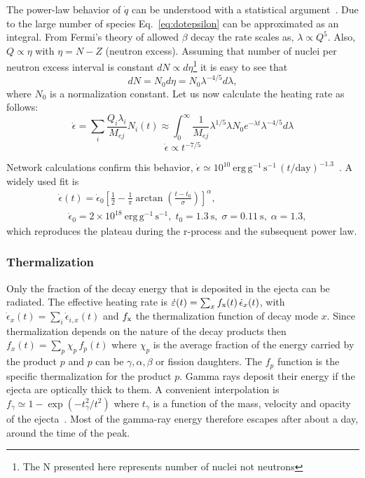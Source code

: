 The power-law behavior of $\dot q$ can be understood with a statistical argument~\cite{metzger_electromagnetic_2010,hotokezaka_analytic_2017}.
Due to the large number of species Eq.~\ref{eq:dotepsilon} can be approximated as an integral.
From Fermi's theory of allowed $\beta$ decay the rate scales as, $\lambda\propto Q^{5}$.
Also, $Q\propto\eta$ with $\eta=N-Z$ (neutron excess).
Assuming that number of nuclei per neutron excess interval is constant $dN\propto d\eta$\footnote{The N presented here represents number of nuclei not neutrons} it is easy to see that
\begin{equation}
  dN=N_0d\eta=N_0\lambda^{-4/5}d\lambda,
\end{equation} 
\noindent where $N_0$ is a normalization constant.
Let us now calculate the heating rate as follows:
\begin{equation}
  \dot\epsilon=\sum_i \frac{Q_i\lambda_i}{M_{ej}} N_i(t)\approx\int_{0}^{\infty}\frac{1}{M_{ej}}\lambda^{1/5}\lambda N_0e^{-\lambda t}\lambda^{-4/5}d\lambda
\end{equation} 
\begin{equation}
  \dot \epsilon \propto t^{-7/5}
\end{equation}

Network calculations confirm this behavior, $\dot \epsilon\simeq10^{10}~\mathrm{erg\,g^{-1}\,s^{-1}}\,(t/\mathrm{day})^{-1.3}$~\cite{metzger_electromagnetic_2010,korobkin_astrophysical_2012}.
A widely used fit is~\cite{korobkin_astrophysical_2012}
\begin{align}\label{eq:korobkin}
  \dot \epsilon(t)=\dot \epsilon_0\left[\frac{1}{2}-\frac{1}{\pi}\arctan\left(\frac{t-t_0}{\sigma}\right)\right]^{\alpha},\\
  \quad \dot \epsilon_0=2\times10^{18}~\mathrm{erg\,g^{-1}\,s^{-1}},\; t_0=1.3~\mathrm{s},\; \sigma=0.11~\mathrm{s},\; \alpha=1.3,
\end{align}
which reproduces the plateau during the r-process and the subsequent power law.
 
\subsubsection{Thermalization}
 
Only the fraction of the decay energy that is deposited in the ejecta can be radiated.
The effective heating rate is $\dot \varepsilon(t)=\sum_x f_{\rm x}(t)\,\dot \epsilon_x(t)$, with $\dot\epsilon_x(t)=\sum_i\dot \epsilon_{i,x}(t)$ and $f_{\rm x}$ the thermalization function of decay mode $x$. 
Since thermalization depends on the nature of the decay products then $f_{x}(t)=\sum_p \chi_p\,f_p(t)$ where $\chi_p$ is the average fraction of the energy carried by the product $p$ and $p$ can be $\gamma,\alpha,\beta$ or fission daughters. The $f_p$ function is the specific thermalization for the product $p$.
Gamma rays deposit their energy if the ejecta are optically thick to them.
A convenient interpolation is $f_\gamma\simeq1-\exp(-t_\gamma^{2}/t^{2})$ where $t_\gamma$ is a function of the mass, velocity and opacity of the ejecta~\cite{barnes_radioactivity_2016,hotokezaka_radioactive_2016}. 
Most of the gamma-ray energy therefore escapes after about a day, around the time of the peak.

